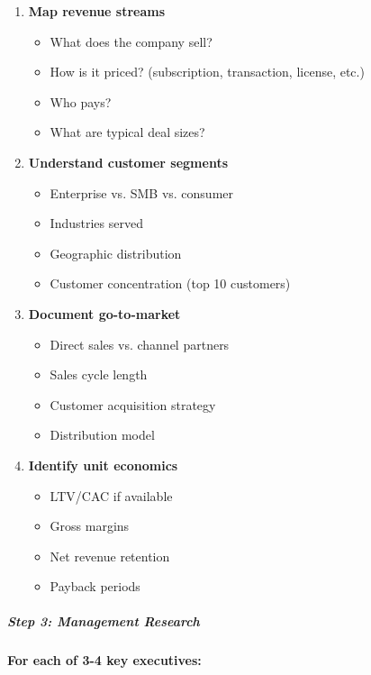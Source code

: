 \documentclass[11pt]{article}
\begin{document}
\begin{enumerate}[leftmargin=*,itemsep=2pt,topsep=2pt]
\item {} \textbf{Map revenue streams}
\begin{itemize}[leftmargin=*,itemsep=2pt,topsep=2pt]
\item {} What does the company sell?
\item {} How is it priced? (subscription, transaction, license, etc.)
\item {} Who pays?
\item {} What are typical deal sizes?
\end{itemize}
\item {} \textbf{Understand customer segments}
\begin{itemize}[leftmargin=*,itemsep=2pt,topsep=2pt]
\item {} Enterprise vs. SMB vs. consumer
\item {} Industries served
\item {} Geographic distribution
\item {} Customer concentration (top 10 customers)
\end{itemize}
\item {} \textbf{Document go-to-market}
\begin{itemize}[leftmargin=*,itemsep=2pt,topsep=2pt]
\item {} Direct sales vs. channel partners
\item {} Sales cycle length
\item {} Customer acquisition strategy
\item {} Distribution model
\end{itemize}
\item {} \textbf{Identify unit economics}
\begin{itemize}[leftmargin=*,itemsep=2pt,topsep=2pt]
\item {} LTV/CAC if available
\item {} Gross margins
\item {} Net revenue retention
\item {} Payback periods
\end{itemize}
\end{enumerate}

\subparagraph{Step 3: Management Research}\mbox{}\par

\textbf{For each of 3-4 key executives:}
\end{document}

